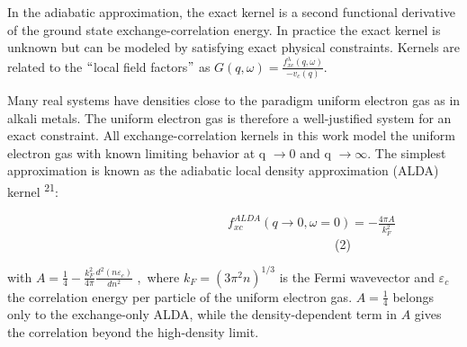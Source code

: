 \documentclass[12pt]{article}
\renewcommand{\_}{\kern-1.5pt\textunderscore\kern-1.5pt}
\begin{document}
\begin{justify}
In the adiabatic approximation, the exact kernel is a second functional derivative of the ground state exchange-correlation energy. In practice the exact kernel is unknown but can be modeled by satisfying exact physical constraints. Kernels are related to the $``$local field factors$"$  as  \( G \left( q, \omega  \right) = \frac{f_{xc}^{ \lambda } \left( q, \omega  \right) }{-v_{c} \left( q \right) }. \) 
\end{justify}\par

\begin{justify}
Many real systems have densities close to the paradigm uniform electron gas as in alkali metals. The uniform electron gas is therefore a well-justified system for an exact constraint. All exchange-correlation kernels in this work model the uniform electron gas with known limiting behavior at q \(  \rightarrow 0 \)  and q \(  \rightarrow \infty. \)  The simplest approximation is known as the adiabatic local density approximation (ALDA) kernel \textsuperscript{21}:
\end{justify}\par


\vspace{\baselineskip}
\setlength{\parskip}{9.96pt}
\setlength{\parskip}{0.0pt}
\begin{Center}
\ \ \ \ \ \ \ \ \ \ \ \ \ \ \ \ \ \ \ \ \ \ \ \ \ \ \ \ \ \ \ \ \ \ \   \( f_{xc}^{ALDA} \left( q \rightarrow 0,  \omega =0 \right) =-\frac{4 \pi A}{k_{F}^{2}} \) \ \ \ \ \ \ \ \ \ \ \ \ \ \ \ \ \ \ \ \ \ \ \ \ \ \ \ \ \ \ \ \ \ \ \ \ \ \ \ \ \ \ \ \ \ \ \ \ \ \ \ \  (2)
\end{Center}\par


\vspace{\baselineskip}
\setlength{\parskip}{9.96pt}
\setlength{\parskip}{0.0pt}
\begin{justify}
with  \( A=\frac{1}{4}-\frac{k_{F}^{2}}{4 \pi }\frac{d^{2} \left( n \varepsilon _{c} \right) }{dn^{2}} \) ,\  where  \( k_{F}= \left( 3 \pi ^{2}n \right) ^{1/3} \)  is the Fermi wavevector and  \(  \varepsilon _{c} \)  the correlation energy per particle of the uniform electron gas.  \( A=\frac{1}{4} \)  belongs only to the exchange-only ALDA, while the density-dependent term in  \( A \)  gives the correlation beyond the high-density limit.
\end{justify}\par
\end{document}
